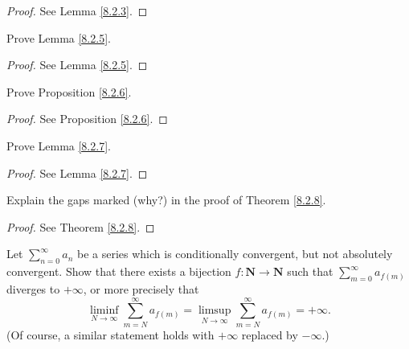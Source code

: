 \begin{proof}
    See Lemma \ref{8.2.3}.
\end{proof}

\begin{exercise}\label{ex 8.2.2}
    Prove Lemma \ref{8.2.5}.
\end{exercise}

\begin{proof}
    See Lemma \ref{8.2.5}.
\end{proof}

\begin{exercise}\label{ex 8.2.3}
    Prove Proposition \ref{8.2.6}.
\end{exercise}

\begin{proof}
    See Proposition \ref{8.2.6}.
\end{proof}

\begin{exercise}\label{ex 8.2.4}
    Prove Lemma \ref{8.2.7}.
\end{exercise}

\begin{proof}
    See Lemma \ref{8.2.7}.
\end{proof}

\begin{exercise}\label{ex 8.2.5}
    Explain the gaps marked (why?) in the proof of Theorem \ref{8.2.8}.
\end{exercise}

\begin{proof}
    See Theorem \ref{8.2.8}.
\end{proof}

\begin{exercise}\label{ex 8.2.6}
    Let \(\sum_{n = 0}^\infty a_n\) be a series which is conditionally convergent, but not absolutely convergent.
    Show that there exists a bijection \(f : \mathbf{N} \to \mathbf{N}\) such that \(\sum_{m = 0}^\infty a_{f(m)}\) diverges to \(+\infty\), or more precisely that
    \[
        \liminf_{N \to \infty} \sum_{m = N}^\infty a_{f(m)} = \limsup_{N \to \infty} \sum_{m = N}^\infty a_{f(m)} = +\infty.
    \]
    (Of course, a similar statement holds with \(+\infty\) replaced by \(-\infty\).)
\end{exercise}

